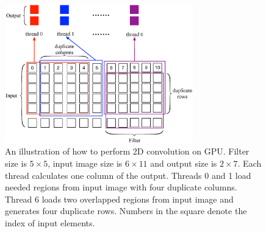 \begin{figure}
\centering
  \includegraphics[width=\columnwidth,height=6cm]{./figure/twostrategies.eps}
  \caption{An illustration of how to perform 2D convolution on GPU. Filter size is $5 \times 5$, input image size is $6 \times 11$ and output size is $2 \times 7$. Each thread calculates one column of the output. Threads 0 and 1 load needed regions from input image with four duplicate columns. Thread 6 loads two overlapped regions from input image and generates four duplicate rows. Numbers in the square denote the index of input elements.}
  \label{fig:twostrategies}
\end{figure}
